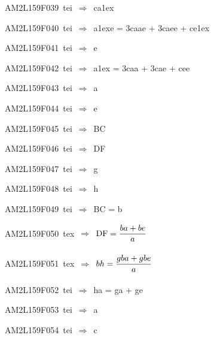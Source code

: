 {\sixrm AM2L159F039\ {\sixit tei}\ }$\Rightarrow$\ {\tenit ca}\raise1ex\hbox{}\par\smallskip
{\sixrm AM2L159F040\ {\sixit tei}\ }$\Rightarrow$\ {\tenit a}\raise1ex\hbox{}{\tenit e} = 3{\tenit caae} + 3{\tenit caee} +
{\tenit ce}\raise1ex\hbox{}\par\smallskip
{\sixrm AM2L159F041\ {\sixit tei}\ }$\Rightarrow$\ {\tenit e}\par\smallskip
{\sixrm AM2L159F042\ {\sixit tei}\ }$\Rightarrow$\ {\tenit a}\raise1ex\hbox{} = 3{\tenit caa} + 3{\tenit cae} + {\tenit cee}\par\smallskip
{\sixrm AM2L159F043\ {\sixit tei}\ }$\Rightarrow$\ {\tenit a}\par\smallskip
{\sixrm AM2L159F044\ {\sixit tei}\ }$\Rightarrow$\ {\tenit e}\par\smallskip
{\sixrm AM2L159F045\ {\sixit tei}\ }$\Rightarrow$\ BC\par\smallskip
{\sixrm AM2L159F046\ {\sixit tei}\ }$\Rightarrow$\ DF\par\smallskip
{\sixrm AM2L159F047\ {\sixit tei}\ }$\Rightarrow$\ {\tenit g}\par\smallskip
{\sixrm AM2L159F048\ {\sixit tei}\ }$\Rightarrow$\ {\tenit h}\par\smallskip
{\sixrm AM2L159F049\ {\sixit tei}\ }$\Rightarrow$\ BC = {\tenit b}\par\smallskip
{\sixrm AM2L159F050\ {\sixit tex}\ }$\Rightarrow$\ ${\rm DF} = {\displaystyle\strut {ba + be}\over \displaystyle\strut a}$\par\smallskip
{\sixrm AM2L159F051\ {\sixit tex}\ }$\Rightarrow$\ $bh = {\displaystyle\strut {gba + gbe}\over \displaystyle\strut a}$\par\smallskip
{\sixrm AM2L159F052\ {\sixit tei}\ }$\Rightarrow$\ {\tenit ha} = {\tenit ga} + {\tenit ge}\par\smallskip
{\sixrm AM2L159F053\ {\sixit tei}\ }$\Rightarrow$\ {\tenit a}\par\smallskip
{\sixrm AM2L159F054\ {\sixit tei}\ }$\Rightarrow$\ {\tenit c}\par\smallskip

